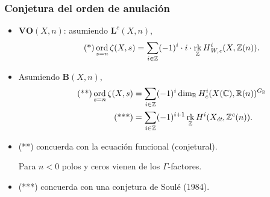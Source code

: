 \documentclass[handout]{beamer}
\newcommand{\CC}{\mathbb{C}}
\newcommand{\RR}{\mathbb{R}}
\newcommand{\ZZ}{\mathbb{Z}}
\DeclareMathOperator{\ord}{ord}
\DeclareMathOperator{\rk}{rk}
\newcommand{\et}{\text{\it ét}}
\newcommand{\Wc}{\text{\it W,c}}
\begin{document}
\begin{frame}
  \frametitle{Conjetura del orden de anulación}

  \begin{itemize}
  \item<2-> $\mathbf{VO} (X,n)$: asumiendo $\mathbf{L}^c (X,n)$,
    \[ \tag{*} \ord_{s=n} \zeta (X,s) =
      \sum_{i \in \ZZ} (-1)^i \cdot i \cdot \rk_\ZZ H^i_\Wc (X, \ZZ (n)). \]

  \item<3-> Asumiendo $\mathbf{B} (X,n)$,
    \begin{align}
      \tag{**} \ord_{s=n} \zeta (X,s) & = \sum_{i \in \ZZ} (-1)^i \dim_\RR H^i_c (X(\CC), \RR (n))^{G_\RR} \\
      \tag{***} & = \sum_{i \in \ZZ} (-1)^{i+1} \rk_\ZZ H^i (X_\et, \ZZ^c (n)).
    \end{align}

  \item<4-> (**) concuerda con la ecuación funcional (conjetural).

    Para $n < 0$ polos y ceros vienen de los $\Gamma$-factores.

  \item<5-> (***) concuerda con una conjetura de Soulé (1984).
  \end{itemize}
\end{frame}

\end{document}
